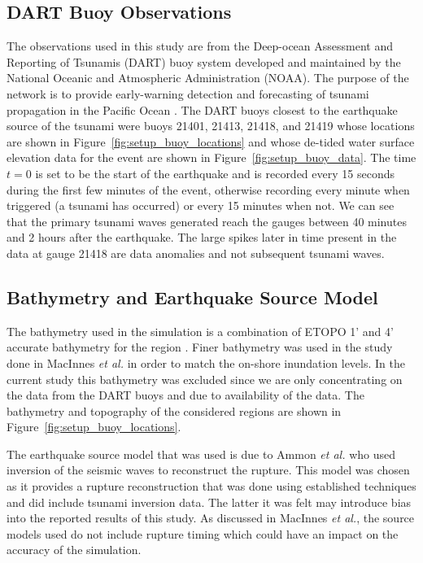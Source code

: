 \subsection{DART Buoy Observations}

The observations used in this study are from the Deep-ocean Assessment and
Reporting of Tsunamis (DART) buoy system developed and maintained by the
National Oceanic and Atmospheric Administration (NOAA).  The purpose of the
network is to provide early-warning detection and forecasting of tsunami
propagation in the Pacific Ocean \cite{Milburn:1996wm}.  The DART buoys closest
to the earthquake source of the \tohoku tsunami were buoys 21401, 21413, 21418,
and 21419 whose locations are shown in Figure~\ref{fig:setup_buoy_locations} and
whose de-tided water surface elevation data for the event are shown in
Figure~\ref{fig:setup_buoy_data}. The time $t=0$ is set to be the start of the
earthquake and is recorded every 15 seconds during the first few minutes of the
event, otherwise recording every minute when triggered (a tsunami has occurred)
or every 15 minutes when not.  We can see that the primary tsunami
waves generated reach the gauges between 40 minutes and 2 hours after the
earthquake.  The large spikes later in time present in the data at gauge 21418
are data anomalies and not subsequent tsunami waves.

\subsection{Bathymetry and Earthquake Source Model}

The bathymetry used in the simulation is a combination of ETOPO 1' and 4'
accurate bathymetry for the region \cite{Amante:2009ud}.  Finer bathymetry was
used in the study done in MacInnes \emph{et al.} in order to match the on-shore
inundation levels.  In the current study this bathymetry was excluded since we
are only concentrating on the data from the DART buoys and due to availability
of the data.  The bathymetry and topography of the considered regions are 
shown in Figure~\ref{fig:setup_buoy_locations}.

The earthquake source model that was used is due to Ammon \emph{et al.}
\cite{Ammon:2011dm} who used inversion of the seismic waves to reconstruct the
rupture.  This model was chosen as it provides a rupture reconstruction that was
done using established techniques and did include tsunami inversion data.  The
latter it was felt may introduce bias into the reported results of this study.
As discussed in MacInnes \emph{et al.}, the source models used do not include
rupture timing which could have an impact on the accuracy of the simulation.